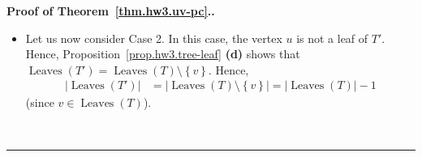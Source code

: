 \documentclass[numbers=enddot,12pt,final,onecolumn,notitlepage]{scrartcl}%
\theoremstyle{definition}
\newenvironment{proof}[1][Proof]{\noindent\textbf{#1.} }{\ \rule{0.5em}{0.5em}}
\newcommand{\set}[1]{\left\{ #1 \right\}}
\newcommand{\abs}[1]{\left| #1 \right|}
\newcommand{\tup}[1]{\left( #1 \right)}
\newcommand{\ive}[1]{\left[ #1 \right]}
\newcommand{\verts}[1]{\operatorname{V}\left( #1 \right)}
\newcommand{\leaves}[1]{\operatorname{Leaves}\left( #1 \right)}
\begin{document}
\begin{proof}[Proof of Theorem~\ref{thm.hw3.uv-pc}.]
\begin{itemize}
        Now, we have shown that $j$ is an element of
        $\ive{\tup{N-1}-1}$, and that this element $j$ satisfies
        $v_j \operatorname{nad}_{T'} v_{j+1}$.
        Hence,
        $j \in \set{i \in \ive{\tup{N-1}-1} \ \mid \ v_i \operatorname{nad}_{T'} v_{i+1} }$.
        
        Now, forget that we fixed $j$.
        We thus have proven that \newline
        $j \in \set{i \in \ive{\tup{N-1}-1} \ \mid \ v_i \operatorname{nad}_{T'} v_{i+1} }$
        for each
        $j \in \set{i \in \ive{N-1} \ \mid \ v_i \operatorname{nad}_T v_{i+1} }$.
        In other words,
        \[
        \set{i \in \ive{N-1} \ \mid \ v_i \operatorname{nad}_T v_{i+1} }
        \subseteq
        \set{i \in \ive{\tup{N-1}-1} \ \mid \ v_i \operatorname{nad}_{T'} v_{i+1} } .
        \]
        This proves \eqref{pf.thm.hw3.uv-pc.c1.2}.]
        
        From \eqref{pf.thm.hw3.uv-pc.c1.2}, we obtain
        \begin{align*}
        \abs{\set{i \in \ive{N-1} \ \mid \ v_i \operatorname{nad}_T v_{i+1} }}
        &\leq
        \abs{\set{i \in \ive{\tup{N-1}-1} \ \mid \ v_i \operatorname{nad}_{T'} v_{i+1} }}
        \\
        &\leq
        \underbrace{\abs{\leaves{T'}}}_{= \abs{\leaves{T}}} - 2
        \qquad \left(\text{by \eqref{pf.thm.hw3.uv-pc.c1.1}}\right) \\
        &= \abs{\leaves{T}} - 2.
        \end{align*}
        
        Thus, we have shown that $\tup{v_1, v_2, \ldots, v_N}$ is a
        listing of $\verts{T}$ such that $v_1 = w$ and $v_N = v$ and
        \[
        \abs{\set{i \in \ive{N-1} \ \mid \ v_i \operatorname{nad}_T v_{i+1} }}
        \leq \abs{\leaves{T}} - 2.
        \]
        In other words, $\tup{v_1, v_2, \ldots, v_N}$ is a helpful
        listing.
        Hence, there exists a helpful listing in Case 1.

\item   Let us now consider Case 2.
        In this case, the vertex $u$ is not a leaf of $T'$.
        Hence, Proposition~\ref{prop.hw3.tree-leaf} \textbf{(d)}
        shows that
        $\leaves{T'} = \leaves{T} \setminus \set{v}$.
        Hence,
        \begin{align*}
        \abs{\leaves{T'}}
        &= \abs{\leaves{T} \setminus \set{v}}
        = \abs{\leaves{T}} - 1
        \end{align*}
        (since $v \in \leaves{T}$).
        

\end{itemize}
\end{proof}
\end{document}
